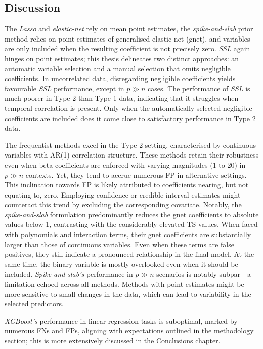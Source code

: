 \documentclass[
  11pt,
]{article}
\begin{document}
\subsection{Discussion}

The \emph{Lasso} and \emph{elastic-net} rely on mean point estimates,
the \emph{spike-and-slab} prior method relies on point estimates of
generalised elastic-net (gnet), and variables are only included when the
resulting coefficient is not precisely zero. \emph{SSL} again hinges on
point estimates; this thesis delineates two distinct approaches: an
automatic variable selection and a manual selection that omits
negligible coefficients. In uncorrelated data, disregarding negligible
coefficients yields favourable \emph{SSL} performance, except in
\(p \gg n\) cases. The performance of \emph{SSL} is much poorer in Type
2 than Type 1 data, indicating that it struggles when temporal
correlation is present. Only when the automatically selected negligible
coefficients are included does it come close to satisfactory performance
in Type 2 data.

The frequentist methods excel in the Type 2 setting, characterised by
continuous variables with AR(1) correlation structure. These methods
retain their robustness even when beta coefficients are enforced with
varying magnitudes (1 to 20) in \(p \gg n\) contexts. Yet, they tend to
accrue numerous FP in alternative settings. This inclination towards FP
is likely attributed to coefficients nearing, but not equating to, zero.
Employing confidence or credible interval estimates might counteract
this trend by excluding the corresponding covariate. Notably, the
\emph{spike-and-slab} formulation predominantly reduces the gnet
coefficients to absolute values below 1, contrasting with the
considerably elevated TS values. When faced with polynomials and
interaction terms, their gnet coefficients are substantially larger than
those of continuous variables. Even when these terms are false
positives, they still indicate a pronounced relationship in the final
model. At the same time, the binary variable is mostly overlooked even
when it should be included. \emph{Spike-and-slab's} performance in
\(p \gg n\) scenarios is notably subpar - a limitation echoed across all
methods. Methods with point estimates might be more sensitive to small
changes in the data, which can lead to variability in the selected
predictors.

\emph{XGBoost's} performance in linear regression tasks is suboptimal,
marked by numerous FNs and FPs, aligning with expectations outlined in
the methodology section; this is more extensively discussed in the
Conclusions chapter.
\end{document}
